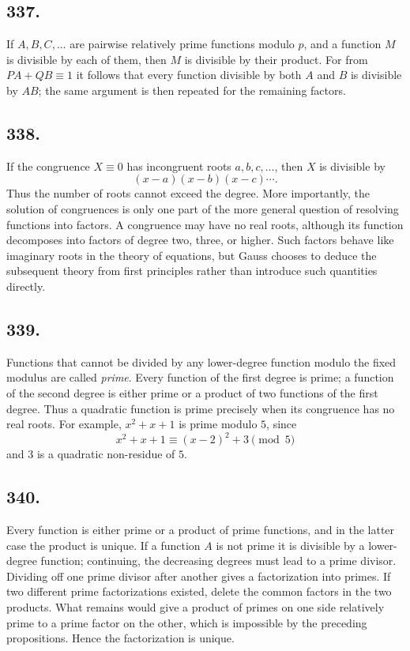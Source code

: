 \documentclass[12pt]{article}
\begin{document}
\subsection*{337.}
If $A,B,C,\ldots$ are pairwise relatively prime functions modulo $p$, and a function $M$ is divisible by each of them, then $M$ is divisible by their product. For from $PA+QB\equiv1$ it follows that every function divisible by both $A$ and $B$ is divisible by $AB$; the same argument is then repeated for the remaining factors.

\subsection*{338.}
If the congruence $X\equiv0$ has incongruent roots $a,b,c,\ldots$, then $X$ is divisible by
\[
(x-a)(x-b)(x-c)\cdots .
\]
Thus the number of roots cannot exceed the degree. More importantly, the solution of congruences is only one part of the more general question of resolving functions into factors. A congruence may have no real roots, although its function decomposes into factors of degree two, three, or higher. Such factors behave like imaginary roots in the theory of equations, but Gauss chooses to deduce the subsequent theory from first principles rather than introduce such quantities directly.

\subsection*{339.}
Functions that cannot be divided by any lower-degree function modulo the fixed modulus are called \emph{prime}. Every function of the first degree is prime; a function of the second degree is either prime or a product of two functions of the first degree. Thus a quadratic function is prime precisely when its congruence has no real roots. For example, $x^2+x+1$ is prime modulo $5$, since
\[
x^2+x+1\equiv (x-2)^2+3\pmod5
\]
and $3$ is a quadratic non-residue of $5$.

\subsection*{340.}
Every function is either prime or a product of prime functions, and in the latter case the product is unique. If a function $A$ is not prime it is divisible by a lower-degree function; continuing, the decreasing degrees must lead to a prime divisor. Dividing off one prime divisor after another gives a factorization into primes. If two different prime factorizations existed, delete the common factors in the two products. What remains would give a product of primes on one side relatively prime to a prime factor on the other, which is impossible by the preceding propositions. Hence the factorization is unique.
\end{document}
